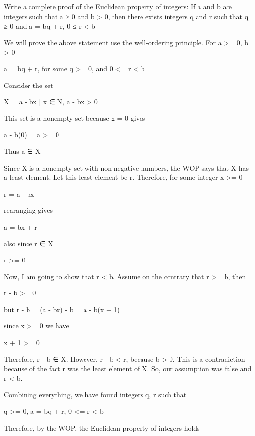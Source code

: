 
Write a complete proof of the Euclidean property of integers:
If a and b are integers such that a ≥ 0 and b > 0,
then there exists integers q and r such that q ≥ 0 and
a = bq + r, 0 ≤ r < b


We will prove the above statement use the well-ordering principle. For a >= 0, b > 0

a = bq + r, for some q >= 0, and 0 <=  r < b

Consider the set

X = {a - bx | x ∈ N, a - bx > 0}

This set is a nonempty set because x = 0 gives

a - b(0) = a >= 0

Thus a ∈ X

Since X is a nonempty set with non-negative numbers, the WOP says that X has a least element. Let this least element be r. Therefore, for some integer x >= 0

r = a - bx

rearanging gives

a = bx + r

also since r ∈ X

r >= 0

Now, I am going to show that r < b. Assume on the contrary that r >= b, then

r - b >= 0

but r - b = (a - bx) - b = a - b(x + 1)

since x >= 0 we have

x + 1 >= 0

Therefore, r - b ∈ X. However, r - b < r, because b > 0. This is a contradiction because of the fact r was the least element of X. So, our assumption was false and r < b.

Combining everything, we have found integers q, r such that

q >= 0, a = bq + r, 0 <= r < b

Therefore, by the WOP, the Euclidean property of integers holds
